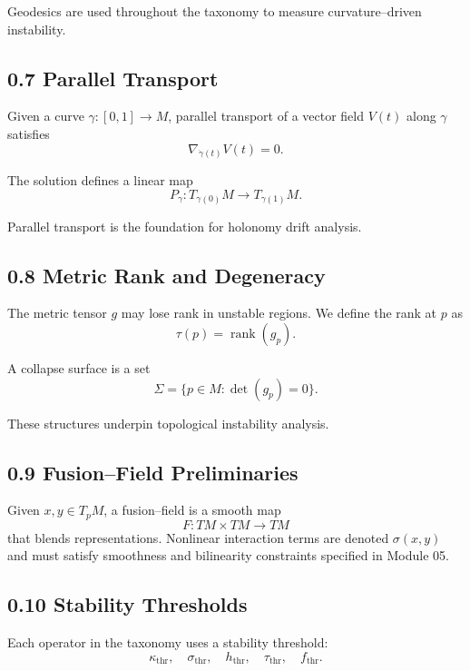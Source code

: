 Geodesics are used throughout the taxonomy to measure curvature–driven
instability.

\subsection*{0.7 Parallel Transport}

Given a curve $\gamma : [0,1] \to M$, parallel transport of a vector
field $V(t)$ along $\gamma$ satisfies
\[
\nabla_{\dot{\gamma}(t)} V(t) = 0.
\]

The solution defines a linear map
\[
P_\gamma : T_{\gamma(0)} M \to T_{\gamma(1)} M.
\]

Parallel transport is the foundation for holonomy drift analysis.

\subsection*{0.8 Metric Rank and Degeneracy}

The metric tensor $g$ may lose rank in unstable regions. We define the
rank at $p$ as
\[
\tau(p) = \operatorname{rank}(g_p).
\]

A collapse surface is a set
\[
\Sigma = \{ p \in M : \det(g_p) = 0 \}.
\]

These structures underpin topological instability analysis.

\subsection*{0.9 Fusion–Field Preliminaries}

Given $x, y \in T_p M$, a fusion–field is a smooth map
\[
F : TM \times TM \to TM
\]
that blends representations. Nonlinear interaction terms are denoted
$\sigma(x,y)$ and must satisfy smoothness and bilinearity constraints
specified in Module 05.

\subsection*{0.10 Stability Thresholds}

Each operator in the taxonomy uses a stability threshold:
\[
\kappa_{\mathrm{thr}}, \quad
\sigma_{\mathrm{thr}}, \quad
h_{\mathrm{thr}}, \quad
\tau_{\mathrm{thr}}, \quad
f_{\mathrm{thr}}.
\]

